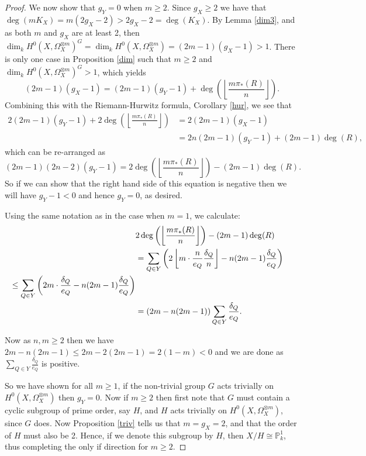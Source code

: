 \begin{proof}
    We now show that $g_Y=0$ when $m\geq 2$. 
    Since $g_X\geq 2$ we have that $\deg(mK_X)=m(2g_X-2)>2g_X-2=\deg(K_X)$.
    By Lemma \ref{dim3}, and as both $m$ and $g_X$ are at least 2, then $\dim_kH^0(X,\Omega_X^{\otimes m})^G=\dim_kH^0(X,\Omega_X^{\otimes m})=(2m-1)(g_X-1)>1$.
    There is only one case in Proposition \ref{dim} such that $m\geq 2$ and $\dim_k H^0(X,\Omega_X^{\otimes m})^G>1$, which yields 
        \begin{equation*}
        (2m-1)(g_X-1)=(2m-1)(g_Y-1)+\deg\left(\left\lfloor \frac{m\pi_*(R)}{n} \right\rfloor \right).
        \end{equation*}
    Combining this with the Riemann-Hurwitz formula, Corollary \ref{hur}, we see that
        \begin{align*}
        2(2m-1)(g_Y-1)+2\deg\left(\left\lfloor\frac{m\pi_*(R)}{n}\right\rfloor\right) & =  2(2m-1)(g_X-1)\\
        & =  2n(2m-1)(g_Y-1)+(2m-1)\deg(R),
        \end{align*}
    which can be re-arranged as
        \begin{equation*}
        (2m-1)(2n-2)(g_Y-1)=2\deg\left(\left\lfloor\frac{m\pi_*(R)}{n}\right\rfloor\right)-(2m-1)\deg(R).
        \end{equation*}
    So if we can show that the right hand side of this equation is negative then we will have $g_Y-1<0$ and hence $g_Y=0$, as desired.
    
    Using the same notation as in the case when $m=1$, we calculate:
        \begin{align*}
        \lefteqn{2\deg\left(\left\lfloor\frac{m\pi_*(R)}{n}\right\rfloor\right)-(2m-1)\deg(R)}\\
        & = \sum_{Q \in Y} \left(2\left\lfloor m\cdot \frac{n}{e_Q}\frac{\delta_Q}{n}\right\rfloor -n(2m-1)\frac{\delta_Q}{e_Q}\right) \\
        \leq   \sum_{Q\in Y}\left( 2m\cdot\frac{\delta_Q}{e_Q}-n(2m-1)\frac{\delta_Q}{e_Q}\right) \\
        & =  (2m-n(2m-1))\sum_{Q\in Y }\frac{\delta_Q}{e_Q}.
        \end{align*}
    
    Now as $n,m\geq 2$ then we have $2m-n(2m-1)\leq 2m-2(2m-1)=2(1-m)<0$ and we are done as $\sum_{Q\in Y}\frac{\delta_Q}{e_Q}$ is positive.
    
    So we have shown for all $m\geq 1$, if the non-trivial group $G$ acts trivially  on $H^0(X,\Omega_X^{\otimes m})$ then $g_Y=0$.
    Now if $m\geq 2$ then first note that $G$ must contain a cyclic subgroup of prime order, say $H$, and $H$ acts trivially on $H^0(X,\Omega_X^{\otimes m})$, since $G$ does.
    Now Proposition \ref{triv} tells us that $m=g_X=2$, and that the order of $H$ must also be 2.
    Hence, if we denote this subgroup by $H$, then $X/H\cong \mathbb{P}_k^1$, thus completing the only if direction for $m\geq 2$.
    

\end{proof}
